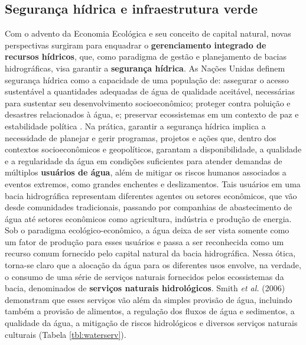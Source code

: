 \documentclass[./main.tex]{subfiles}
\begin{document}
\subsection{Segurança hídrica e infraestrutura verde} \label{sec:watersheds:watersecurity}

\par Com o advento da Economia Ecológica e seu conceito de capital natural, novas perspectivas surgiram para enquadrar o \textbf{gerenciamento integrado de recursos hídricos}, que, como paradigma de gestão e planejamento de bacias hidrográficas, visa garantir a \textbf{segurança hídrica}. As Nações Unidas definem segurança hídrica como a capacidade de uma população de: assegurar o acesso sustentável a quantidades adequadas de água de qualidade aceitável, necessárias para sustentar seu desenvolvimento socioeconômico; proteger contra poluição e desastres relacionados à água, e; preservar ecossistemas em um contexto de paz e estabilidade política \cite{cassin2021}. Na prática, garantir a segurança hídrica implica a necessidade de planejar e gerir programas, projetos e ações que, dentro dos contextos socioeconômicos e geopolíticos, garantam a disponibilidade, a qualidade e a regularidade da água em condições suficientes para atender demandas de múltiplos \textbf{usuários de água}, além de mitigar os riscos humanos associados a eventos extremos, como grandes enchentes e deslizamentos. Tais usuários em uma bacia hidrográfica representam diferentes agentes ou setores econômicos, que vão desde comunidades tradicionais, passando por companhias de abastecimento de água até setores econômicos como agricultura, indústria e produção de energia. Sob o paradigma ecológico-econômico, a água deixa de ser vista somente como um fator de produção para esses usuários e passa a ser reconhecida como um recurso comum fornecido pelo capital natural da bacia hidrográfica. Nessa ótica, torna-se claro que a alocação da água para os diferentes usos envolve, na verdade, o consumo de uma série de serviços naturais fornecidos pelos ecossistemas da bacia, denominados de \textbf{serviços naturais hidrológicos}. Smith \textit{et al.} (2006) \cite{Smith2006a} demonstram que esses serviços vão além da simples provisão de água, incluindo também a provisão de alimentos, a regulação dos fluxos de água e sedimentos, a qualidade da água, a mitigação de riscos hidrológicos e diversos serviços naturais culturais (Tabela \ref{tbl:waterserv}).
\end{document}
